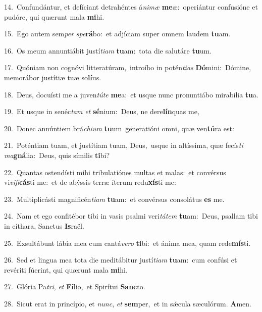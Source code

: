 {\numbfont\textcolor{\numbcolor}{14.}}~Confundántur, et defíciant detrahéntes á\-\textit{ni}\-\textit{mæ} \textbf{me}\-æ:~\star operiántur confusióne et pudóre, qui quærunt mala \textbf{mi}\-hi.\par
{\numbfont\textcolor{\numbcolor}{15.}}~Ego autem sem\textit{per} \textit{spe}\-\textbf{rá}bo:~\star et adjíciam super omnem laudem \textbf{tu}\-am.\par
{\numbfont\textcolor{\numbcolor}{16.}}~Os meum annuntiábit justí\-\textit{ti}\-\textit{am} \textbf{tu}\-am:~\star tota die salutáre \textbf{tu}\-um.\par
{\numbfont\textcolor{\numbcolor}{17.}}~Quóniam non cognóvi litteratúram,~\dagger introíbo in potén\-\textit{ti}\-\textit{as} \textbf{Dó}\-mini:~\star Dómine, memorábor justítiæ tuæ so\-\textbf{lí}\-us.\par
{\numbfont\textcolor{\numbcolor}{18.}}~Deus, docuísti me a juven\-\textit{tú}\-\textit{te} \textbf{me}\-a:~\star et usque nunc pronuntiábo mirabília \textbf{tu}\-a.\par
{\numbfont\textcolor{\numbcolor}{19.}}~Et usque in senéc\textit{tam} \textit{et} \textbf{sé}\-nium:~\star Deus, ne dere\-\textbf{lín}\-quas me,\par
{\numbfont\textcolor{\numbcolor}{20.}}~Donec annúntiem brá\-\textit{chi}\-\textit{um} \textbf{tu}\-um~\star generatióni omni, quæ ven\-\textbf{tú}\-ra est:\par
{\numbfont\textcolor{\numbcolor}{21.}}~Poténtiam tuam, et justítiam tuam, Deus,~\dagger usque in altíssima, quæ fecís\textit{ti} \textit{ma}\-\textbf{gná}lia:~\star Deus, quis símilis \textbf{ti}\-bi?\par
{\numbfont\textcolor{\numbcolor}{22.}}~Quantas ostendísti mihi tribulatiónes multas et malas:~\dagger et convérsus vi\-\textit{vi}\-\textit{fi}\textbf{cás}ti me:~\star et de abýssis terræ íterum redu\-\textbf{xís}\-ti me:\par
{\numbfont\textcolor{\numbcolor}{23.}}~Multiplicásti magnificén\-\textit{ti}\-\textit{am} \textbf{tu}\-am:~\star et convérsus consolátus \textbf{es} me.\par
{\numbfont\textcolor{\numbcolor}{24.}}~Nam et ego confitébor tibi in vasis psalmi veri\-\textit{tá}\-\textit{tem} \textbf{tu}\-am:~\star Deus, psallam tibi in cíthara, Sanctus \textbf{Is}\-raël.\par
{\numbfont\textcolor{\numbcolor}{25.}}~Exsultábunt lábia mea cum cantá\-\textit{ve}\-\textit{ro} \textbf{ti}\-bi:~\star et ánima mea, quam rede\-\textbf{mís}\-ti.\par
{\numbfont\textcolor{\numbcolor}{26.}}~Sed et lingua mea tota die meditábitur justí\-\textit{ti}\-\textit{am} \textbf{tu}\-am:~\star cum confúsi et revériti fúerint, qui quærunt mala \textbf{mi}\-hi.\par
{\numbfont\textcolor{\numbcolor}{27.}}~Glória Pa\-\textit{tri}\-, \textit{et} \textbf{Fí}\-lio,~\star et Spirítui \textbf{Sanc}\-to.\par
{\numbfont\textcolor{\numbcolor}{28.}}~Sicut erat in princípio, et \textit{nunc}\-, \textit{et} \textbf{sem}\-per,~\star et in sǽcula sæculórum. \textbf{A}\-men.\par
